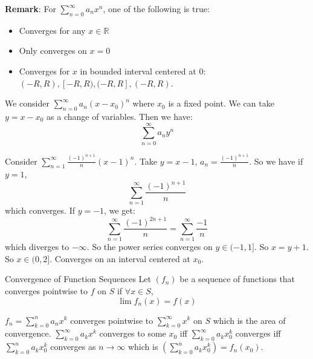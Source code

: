 \documentclass{report}
\begin{document}
\textbf{Remark}: For $\sum_{n = 0}^{\infty} a_{n}x^{n}$, one of the following is true:
    \begin{itemize}
        \item Converges for any $x \in \mathbb{R}$

        \item Only converges on $x = 0$

        \item Converges for $x$ in bounded interval centered at $0$: $(-R, R), [-R, R), (-R, R], (-R, R)$. 
    \end{itemize}

We consider $\sum_{n = 0}^{\infty} a_{n}(x - x_{0})^{n}$ where $x_{0}$ is a fixed point. We can take $y = x - x_{0}$ as a change of variables. Then we have:
    \begin{equation*}
        \sum_{n = 0}^{\infty} a_{n}y^{n}
    \end{equation*}

\begin{examples}
    \begin{example}
        Consider $\sum_{n = 1}^{\infty}\frac{(-1)^{n + 1}}{n}(x - 1)^{n}$. Take $y = x - 1$, $a_{n} = \frac{(-1)^{n + 1}}{n}$. So we have if $y = 1$, 
            \begin{equation*}
                \sum_{n = 1}^{\infty}\dfrac{(-1)^{n + 1}}{n}
            \end{equation*}
        which converges. If $y = -1$, we get:
            \begin{equation*}
                \sum_{n = 1}^{\infty}\dfrac{(-1)^{2n + 1}}{n} = \sum_{n = 1}^{\infty}\dfrac{-1}{n}
            \end{equation*}
        which diverges to $-\infty$. So the power series converges on $y \in (-1, 1]$. So $x = y + 1$. So $x \in (0, 2]$. Converges on an interval centered at $x_{0}$.
    \end{example}
\end{examples}

\begin{definition}{Convergence of Function Sequences}
    Let $(f_{n})$ be a sequence of functions that converges pointwise to $f$ on $S$ if $\forall  x \in S$,
        \begin{equation*}
            \lim f_{n}(x) = f(x)
        \end{equation*}
\end{definition}

\begin{examples}
    $f_{n} = \sum_{k = 0}^{n}a_{n}x^{k}$ converges pointwise to $\sum_{k = 0}^{\infty} x^{k}$ on $S$ which is the area of convergence. $\sum_{k = 0}^{\infty} a_{k}x^{k}$ converges to some $x_{0}$ iff $\sum_{k = 0}^{\infty} a_{k}x^{k}_{0}$ converges iff $\sum_{k = 0}^{n}a_{k}x_{0}^{k}$ converges as $n \rightarrow \infty$ which is $(\sum_{k = 0}^{n}a_{k}x_{0}^{k}) = f_{n}(x_{0})$.
\end{examples}
\end{document}

